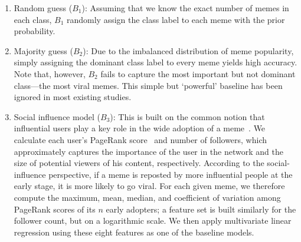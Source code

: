 \documentclass[letterpaper]{article}
\begin{document}
\begin{enumerate}

\item Random guess ($B_1$): Assuming that we know the exact number of memes in
    each class, $B_1$ randomly assign the class label to each meme with the prior
    probability.

\item Majority guess ($B_2$): Due to the imbalanced distribution of meme
    popularity, simply assigning the dominant class label to every meme yields
    high accuracy. Note that, however, $B_2$ fails to capture the most important
    but not dominant class---the most viral memes.  This simple but `powerful' 
    baseline has been ignored in most existing studies.


\item Social influence model ($B_3$): 
This is built on the common notion that influential users play a key role in the wide adoption of a meme~\cite{Kitsak2010kcore,cha2010measuring,Suh2010,bakshy_everyones_2011}.
We calculate each user's PageRank score~\cite{brin1998anatomy} and number of followers, which approximately captures the importance of the user in the network and the size of potential viewers of his content, respectively. %
 According to the social-influence perspective, if a meme is reposted by more influential people at the early stage, it is more likely to go viral. 
For each given meme, we therefore compute the maximum, mean, median, and coefficient of
variation among PageRank scores of its $n$ early adopters; a feature set is built similarly for the follower count, but on a logarithmic scale. We then apply multivariate linear regression using these eight features as one of the baseline models.


\end{enumerate}
\end{document}
